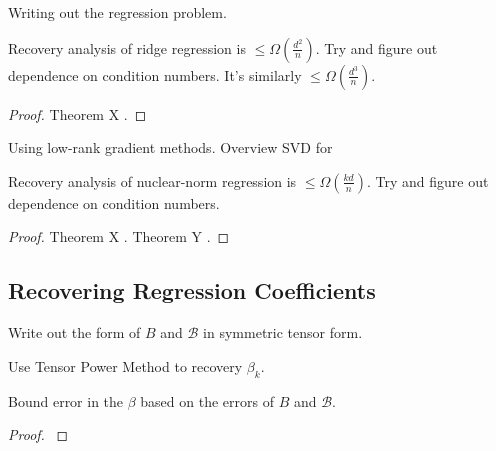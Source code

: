 Writing out the regression problem.

\begin{lemma}
  Recovery analysis of ridge regression is $\le \Omega(\frac{d^2}{n})$.
  Try and figure out dependence on condition numbers. It's similarly
  $\le \Omega(\frac{d^3}{n})$.
\end{lemma}
\begin{proof}
  Theorem X \cite{HsuKakadeZhang2011}.
\end{proof}

Using low-rank gradient methods. Overview SVD for 

\begin{lemma}
  Recovery analysis of nuclear-norm regression is $\le
  \Omega(\frac{kd}{n})$. Try and figure out dependence on condition
  numbers.
\end{lemma}
\begin{proof}
  Theorem X \cite{NegahbanWainwright2009}.
  Theorem Y \cite{Tomioka2011}.
\end{proof}

\subsection{Recovering Regression Coefficients}

Write out the form of $B$ and $\mathcal{B}$ in symmetric tensor form.

Use Tensor Power Method to recovery $\beta_k$.

\begin{lemma}
  Bound error in the $\beta$ based on the errors of $B$ and $\mathcal{B}$.
\end{lemma}
\begin{proof}
  \cite{AnandkumarGeHsu2012}
\end{proof}

